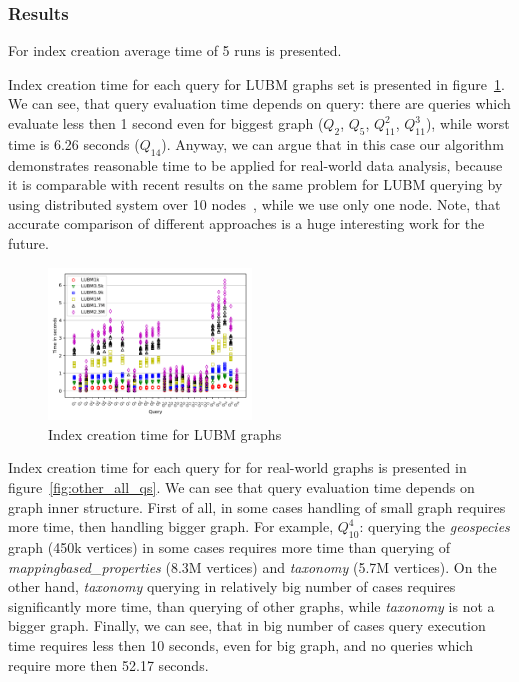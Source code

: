 \subsubsection{Results}

For index creation average time of 5 runs is presented.

Index creation time for each query for LUBM graphs set is presented in figure~\ref{fig:lubm_all_qs}.
We can see, that query evaluation time depends on query: there are queries which evaluate less then 1 second even for biggest graph ($Q_2$, $Q_5$, $Q_{11}^2$, $Q_{11}^3$), while worst time is 6.26 seconds ($Q_{14}$).
Anyway, we can argue that in this case our algorithm demonstrates reasonable time to be applied for real-world data analysis, because it is comparable with recent results on the same problem for LUBM querying by using distributed system over 10 nodes~\cite{Wang2019}, while we use only one node. 
Note, that accurate comparison of different approaches is a huge interesting work for the future.

\begin{figure}
   \includegraphics[width=0.48\textwidth]{data/LUBM_all.pdf}
   \caption{Index creation time for LUBM graphs}
   \label{fig:lubm_all_qs}
\end{figure}

Index creation time for each query for for real-world graphs is presented in figure~\ref{fig:other_all_qs}.
We can see that query evaluation time depends on graph inner structure. 
First of all, in some cases handling of small graph requires more time, then handling bigger graph.
For example, $Q_{10}^4$: querying the \textit{geospecies} graph (450k vertices) in some cases requires more time than querying of \textit{mappingbased\_properties} (8.3M vertices) and \textit{taxonomy} (5.7M vertices).
On the other hand, \textit{taxonomy} querying in relatively big number of cases requires significantly more time, than querying of other graphs, while \textit{taxonomy} is not a bigger graph. 
Finally, we can see, that in big number of cases query execution time requires less then 10 seconds, even for big graph, and no queries which require more then 52.17 seconds. 

